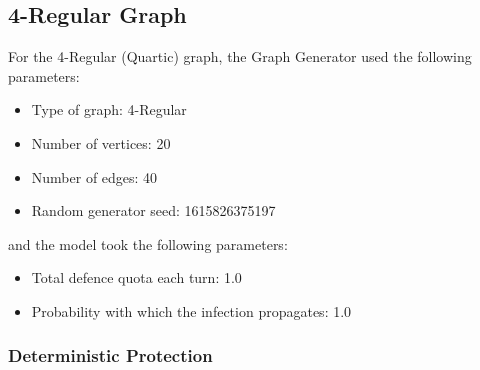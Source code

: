 \documentclass[results.tex]{subfiles}
\begin{document}
\newpage

\subsection{4-Regular Graph}

For the 4-Regular (Quartic) graph, the Graph Generator used the following parameters:

\begin{itemize}
\item Type of graph: 4-Regular
\item Number of vertices: 20
\item Number of edges: 40
\item Random generator seed: 1615826375197
\end{itemize}
and the model took the following parameters:
\begin{itemize}
\item Total defence quota each turn: 1.0
\item Probability with which the infection propagates: 1.0
\end{itemize}

\subsubsection{Deterministic Protection}



\newpage
\end{document}
